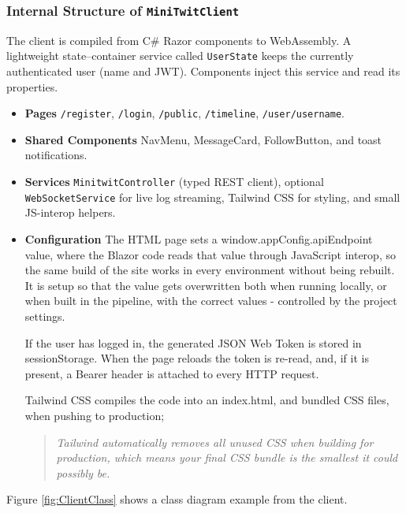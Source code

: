 \subsubsection{Internal Structure of \texttt{MiniTwitClient}}

The client is compiled from C\# Razor components to WebAssembly.  A
lightweight state–container service called \lstinline{UserState} keeps the currently authenticated user (name and JWT). Components inject this service and read its properties.

\begin{itemize}
  \item \textbf{Pages}  
        \lstinline{/register}, \lstinline{/login}, \lstinline{/public},
        \lstinline{/timeline}, \lstinline{/user/username}.
  \item \textbf{Shared Components}  
        NavMenu, MessageCard, FollowButton, and toast notifications.
  \item \textbf{Services}  
        \lstinline{MinitwitController} (typed REST client),
        optional \lstinline{WebSocketService} for live log streaming,
        Tailwind CSS for styling, and small JS-interop helpers.
  \item \textbf{Configuration}
The HTML page sets a window.appConfig.apiEndpoint value, where the Blazor code reads that value through JavaScript interop, so the same build of the site works in every environment without being rebuilt. It is setup so that the value gets overwritten both when running locally, or when built in the pipeline, with the correct values - controlled by the project settings.

If the user has logged in, the generated JSON Web Token is stored in sessionStorage. When the page reloads the token is re-read, and, if it is present, a Bearer header is attached to every HTTP request.

Tailwind CSS compiles the code into an index.html, and bundled CSS files, when pushing to production;
\begin{quote}
    \textit{Tailwind automatically removes all unused CSS when building for production, which means your final CSS bundle is the smallest it could possibly be.} \cite{tailwind}
\end{quote}

\end{itemize}

Figure \ref{fig:ClientClass} shows a class diagram example from the client.

